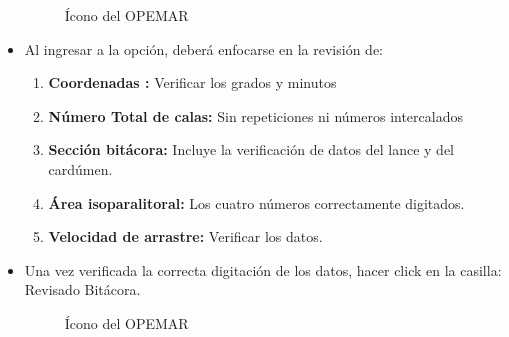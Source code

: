 \documentclass[a4paper,oneside,11pt]{book}
\begin{document}
\begin{itemize}
\begin{figure}[!h]
 \begin{center} 
 \caption{Ícono del OPEMAR}
\end{center}
 \end{figure}

\item Al ingresar a la opción, deberá enfocarse en la revisión de:

\begin{enumerate}
\item \textbf{Coordenadas : }Verificar los grados y minutos 
\item \textbf{ Número Total de calas:} Sin repeticiones ni números intercalados
\item \textbf{Sección bitácora: }Incluye la verificación de datos del lance y del cardúmen.
\item \textbf{Área isoparalitoral:} Los cuatro números correctamente digitados.
\item \textbf{Velocidad de arrastre:} Verificar los datos.
\end{enumerate}

\newpage

\item Una vez verificada la correcta digitación de los datos, hacer click en la casilla: Revisado Bitácora.

\begin{figure}[!h]
 \begin{center} 
 \caption{Ícono del OPEMAR}
\end{center}
 \end{figure}






\end{itemize}
\end{document}
